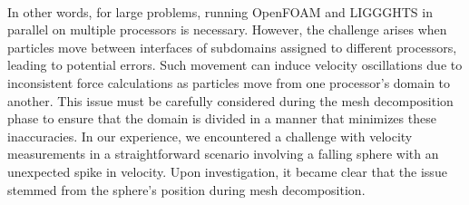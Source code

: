 In other words, for large problems, running OpenFOAM and LIGGGHTS \textsuperscript{\textregistered} in parallel on multiple processors is necessary. However, the challenge arises when particles move between interfaces of subdomains assigned to different processors, leading to potential errors. Such movement can induce velocity oscillations due to inconsistent force calculations as particles move from one processor's domain to another. This issue must be carefully considered during the mesh decomposition phase to ensure that the domain is divided in a manner that minimizes these inaccuracies. In our experience, we encountered a challenge with velocity measurements in a straightforward scenario involving a falling sphere with an unexpected spike in velocity. Upon investigation, it became clear that the issue stemmed from the sphere's position during mesh decomposition. 
